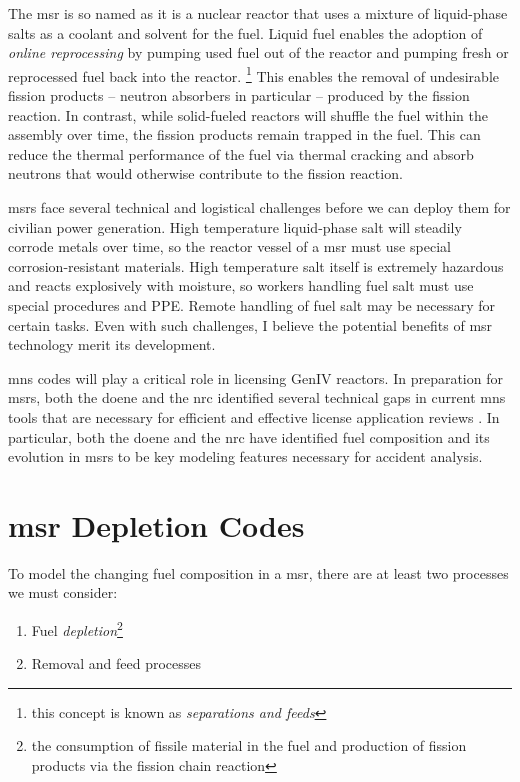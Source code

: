 The \Gls{msr} is so named as it is a nuclear reactor that uses a mixture of
liquid-phase salts as a coolant and solvent for the fuel. Liquid fuel enables
the adoption of {\it online reprocessing} by pumping used fuel out of the
reactor and pumping fresh or reprocessed fuel back into the reactor.
\footnote{this concept is known as {\it separations and feeds}} This
enables the removal of undesirable fission products -- neutron absorbers in
particular -- produced by the fission reaction. In contrast, while solid-fueled
reactors will shuffle the fuel within the assembly over time, the fission
products remain trapped in the fuel. This can reduce the thermal performance of
the fuel via thermal cracking and absorb neutrons that would otherwise
contribute to the fission reaction. 

\Gls{msr}s face several technical and logistical challenges before we can
deploy them for civilian power generation. High temperature liquid-phase salt
will steadily corrode metals over time, so the reactor vessel of a \Gls{msr}
must use special corrosion-resistant materials. High temperature salt itself is
extremely hazardous and reacts explosively with moisture, so workers handling
fuel salt must use special procedures and PPE. Remote handling of fuel salt may
be necessary for certain tasks. Even with such challenges, I believe the
potential benefits of \Gls{msr} technology merit its development.

\Gls{mns} codes will play a critical role in licensing GenIV reactors. In
preparation for \Gls{msr}s, both the \Gls{doene} and the \Gls{nrc}
identified several technical gaps in current \Gls{mns} tools that are necessary
for efficient and effective license application reviews
\cite{betzler_modeling_2019} \cite{usnrc_nonlwr_2020-1}. In particular, both the
\Gls{doene} and the \Gls{nrc} have identified fuel composition and its
evolution in \Gls{msr}s to be key modeling features necessary for accident
analysis. 

\section{\Gls{msr} Depletion Codes}%
\label{sec:msr_codes}

To model the changing fuel composition in a \Gls{msr}, there are at least two
processes we must consider:
\begin{enumerate}
    \item Fuel {\it depletion}\footnote{the consumption of fissile material in the fuel and production of fission products via the fission chain reaction}
    \item Removal and feed processes
\end{enumerate}


